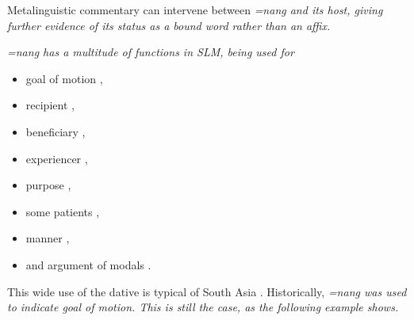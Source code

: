 Metalinguistic commentary can intervene between \em =nang \em and its host, giving further evidence of its status as a bound word rather than an affix.



 


\em =nang \em has a multitude of functions in SLM, being used for
\begin{itemize}
 \item  goal of motion ,
 \item  recipient ,
 \item  beneficiary ,
 \item  experiencer ,
 \item  purpose ,
 \item  some patients ,
 \item  manner ,
 \item  and argument of modals .
\end{itemize}

This wide use of the dative is typical of South Asia \citep{Masica1976, Sridhar1976cls,Sridhar1976sils,Sridhar1979,VermaEtAlEd1990,Abbi1994,BhaskararaoEtAlEd2004I,BhaskararaoEtAlEd2004II}.
Historically, \em =nang \em was used to indicate goal of motion. This is still the case, as the following example shows.
  


